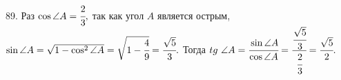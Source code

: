 89. Раз $\cos \angle A=\cfrac{2}{3},$ так как угол $A$ является острым, $\sin \angle A=\sqrt{1-\cos^2 \angle A}=\sqrt{1-\cfrac{4}{9}}=\cfrac{\sqrt{5}}{3}.$ Тогда $tg\ \angle A=\cfrac{\sin \angle A}{\cos \angle A}=\cfrac{\cfrac{\sqrt{5}}{3}}{\cfrac{2}{3}}=\cfrac{\sqrt{5}}{2}.$\\
